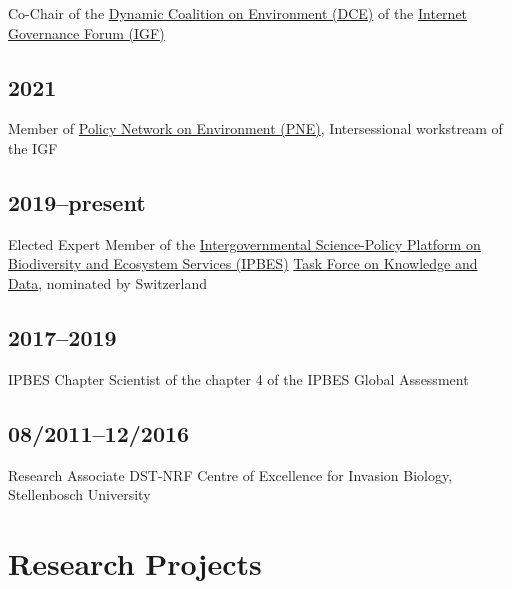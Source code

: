 \documentclass[a4paper]{article}
\begin{document}
Co-Chair of the \href{https://intgovforum.org/en/content/dynamic-coalition-on-environment-dce}{Dynamic Coalition on Environment (DCE)} of the \href{https://intgovforum.org/en}{Internet Governance Forum (IGF)}

\subsection{2021}

Member of \href{https://www.intgovforum.org/en/content/policy-network-on-environment-pne}{Policy Network on Environment (PNE)}, Intersessional workstream of the IGF

\subsection{2019--present}

Elected Expert Member of the \href{https://ipbes.net/}{Intergovernmental Science-Policy Platform on Biodiversity and Ecosystem Services (IPBES)} \href{https://ipbes.net/knowledge-data}{Task Force on Knowledge and Data}, nominated by Switzerland

\subsection{2017--2019}

IPBES Chapter Scientist of the chapter 4 of the IPBES Global Assessment

\subsection{08/2011--12/2016}

Research Associate DST-NRF Centre of Excellence for Invasion Biology, Stellenbosch University


\section{Research Projects}
\end{document}
